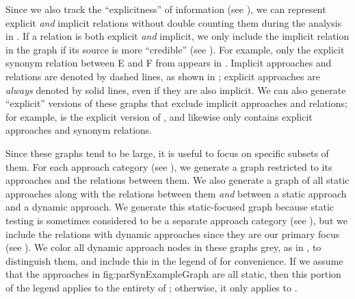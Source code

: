    \label{graphExplicit}
    Since we also track the ``explicitness'' of information
    (see ), we can represent explicit
    \emph{and} implicit relations without double counting them during the
    analysis in . If a relation is both explicit
    \emph{and} implicit, we only include the implicit relation in the graph
    if its source is more ``credible'' (see ).
    For example, only the explicit synonym relation between E and F
    from  appears in .
    Implicit approaches and relations are denoted by dashed lines, as shown
    in ; explicit approaches are
    \emph{always} denoted by solid lines, even if they are also implicit.
    We can also generate ``explicit'' versions of these graphs that exclude
    implicit approaches and relations; for example, 
    is the explicit version of , and
     likewise only contains explicit approaches and
    synonym relations.

\fi
Since these graphs tend to be large, it is useful to focus on specific
subsets of them. \ifnotpaper For each approach category (see
    ), we generate a graph restricted to its approaches
    and the relations between them. We also generate a graph of all static
    approaches along with the relations between them \emph{and} between a
    static approach and a dynamic approach. We generate this static-focused
    graph because static testing is sometimes considered to be a separate
    approach category (see ), but we include the
    relations with dynamic approaches since they are our primary focus
    (see ). We color all dynamic approach nodes in these
    graphs grey, as in , to distinguish them,
    and include this in the legend of  for convenience.
    If we assume that the approaches in 
    {fig:parSynExampleGraph} are all static, then this portion of the legend
    applies to the entirety of ; otherwise, it only
    applies to .

